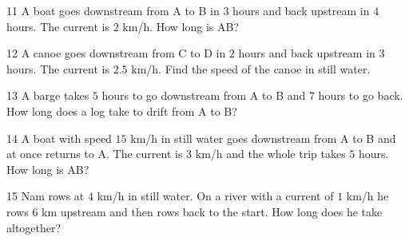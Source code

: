 \begin{probbox}{11}{\relax}
A boat goes downstream from A to B in $3$ hours and back upstream in $4$ hours. The current is $2$ km/h. How long is AB?
\end{probbox}
\gap
\begin{probbox}{12}{\relax}
A canoe goes downstream from C to D in $2$ hours and back upstream in $3$ hours. The current is $2.5$ km/h. Find the speed of the canoe in still water.
\end{probbox}
\gap
\begin{probbox}{13}{\relax}
A barge takes $5$ hours to go downstream from A to B and $7$ hours to go back. How long does a log take to drift from A to B?
\end{probbox}
\gap
\begin{probbox}{14}{\relax}
A boat with speed $15$ km/h in still water goes downstream from A to B and at once returns to A. The current is $3$ km/h and the whole trip takes $5$ hours. How long is AB?
\end{probbox}
\gap
\begin{probbox}{15}{\relax}
Nam rows at $4$ km/h in still water. On a river with a current of $1$ km/h he rows $6$ km upstream and then rows back to the start. How long does he take altogether?
\end{probbox}
